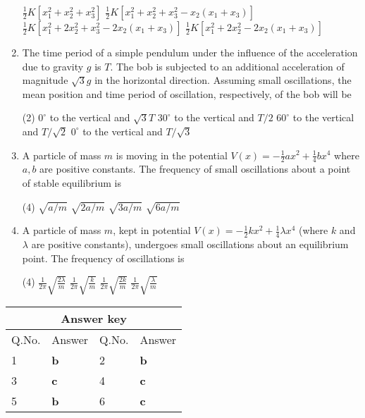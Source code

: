 \begin{enumerate}
\begin{tasks}
	\task[\textbf{A.}] $\frac{1}{2} K\left[x_{1}^{2}+x_{2}^{2}+x_{3}^{2}\right]$
	\task[\textbf{B.}]$\frac{1}{2} K\left[x_{1}^{2}+x_{2}^{2}+x_{3}^{2}-x_{2}\left(x_{1}+x_{3}\right)\right]$
	\task[\textbf{C.}]$\frac{1}{2} K\left[x_{1}^{2}+2 x_{2}^{2}+x_{3}^{2}-2 x_{2}\left(x_{1}+x_{3}\right)\right]$
	\task[\textbf{D.}]$\frac{1}{2} K\left[x_{1}^{2}+2 x_{2}^{2}-2 x_{2}\left(x_{1}+x_{3}\right)\right]$
\end{tasks}
	\item The time period of a simple pendulum under the influence of the acceleration due to gravity $g$ is $T$. The bob is subjected to an additional acceleration of magnitude $\sqrt{3} g$ in the horizontal direction. Assuming small oscillations, the mean position and time period of oscillation, respectively, of the bob will be
	{}
\begin{tasks}(2)
	\task[\textbf{A.}] $0^{\circ}$ to the vertical and $\sqrt{3} T$
	\task[\textbf{B.}]$30^{\circ}$ to the vertical and $T / 2$
	\task[\textbf{C.}]$60^{\circ}$ to the vertical and $T / \sqrt{2}$
	\task[\textbf{D.}]$0^{\circ}$ to the vertical and $T / \sqrt{3}$
\end{tasks}
	\item A particle of mass $m$ is moving in the potential $V(x)=-\frac{1}{2} a x^{2}+\frac{1}{4} b x^{4}$ where $a, b$ are positive constants. The frequency of small oscillations about a point of stable equilibrium is
	{}
\begin{tasks}(4)
	\task[\textbf{A.}] $\sqrt{a / m}$
	\task[\textbf{B.}]$\sqrt{2 a / m}$
	\task[\textbf{C.}]$\sqrt{3 a / m}$
	\task[\textbf{D.}]$\sqrt{6 a / m}$
\end{tasks}
	\item A particle of mass $m$, kept in potential $V(x)=-\frac{1}{2} k x^{2}+\frac{1}{4} \lambda x^{4}$ (where $k$ and $\lambda$ are positive constants), undergoes small oscillations about an equilibrium point. The frequency of oscillations is
	{}
\begin{tasks}(4)
	\task[\textbf{A.}] $\frac{1}{2 \pi} \sqrt{\frac{2 \lambda}{m}}$
	\task[\textbf{B.}]$\frac{1}{2 \pi} \sqrt{\frac{k}{m}}$
	\task[\textbf{C.}]$\frac{1}{2 \pi} \sqrt{\frac{2 k}{m}}$
	\task[\textbf{D.}]$\frac{1}{2 \pi} \sqrt{\frac{\lambda}{m}}$
\end{tasks}
 \end{enumerate}
\setlength\arrayrulewidth{1pt}
\begin{table}[H]
	\centering
	
	\begin{tabular}{|p{1.5cm}|p{1.5cm}||p{1.5cm}|p{1.5cm}|}
		\hline
		\multicolumn{4}{|c|}{\textbf{Answer key}}\\\hline\hline
		\rowcolor{ocrel}Q.No.&Answer&Q.No.&Answer\\\hline
		1&\textbf{b}&2&\textbf{b}\\\hline
		3&\textbf{c}&4&\textbf{c}\\\hline
		5&\textbf{b}&6&\textbf{c}\\\hline
	\end{tabular}
\end{table}
